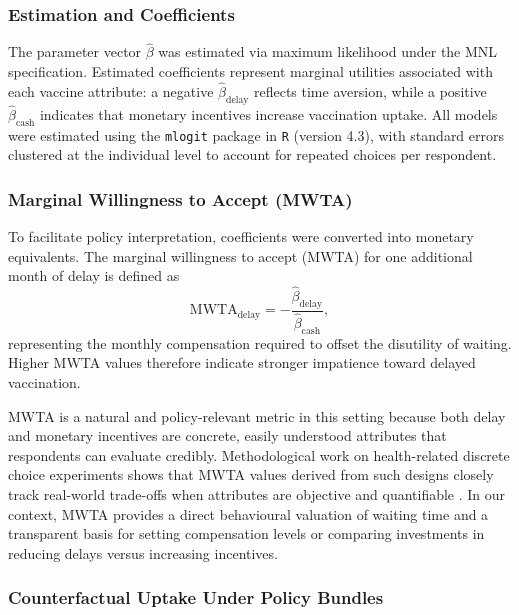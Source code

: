 \documentclass[12pt]{article}
\begin{document}
\subsubsection{Estimation and Coefficients}

The parameter vector $\hat{\beta}$ was estimated via maximum likelihood under the MNL
specification. Estimated coefficients represent marginal utilities associated with each
vaccine attribute: a negative $\hat{\beta}_{\text{delay}}$ reflects time aversion, while a
positive $\hat{\beta}_{\text{cash}}$ indicates that monetary incentives increase vaccination
uptake. All models were estimated using the \texttt{mlogit} package in \texttt{R} (version
4.3), with standard errors clustered at the individual level to account for repeated choices
per respondent.

\subsubsection{Marginal Willingness to Accept (MWTA)}

To facilitate policy interpretation, coefficients were converted into monetary equivalents.
The marginal willingness to accept (MWTA) for one additional month of delay is defined as
\[
\text{MWTA}_{\text{delay}} = -\frac{\hat{\beta}_{\text{delay}}}{\hat{\beta}_{\text{cash}}},
\]
representing the monthly compensation required to offset the disutility of waiting. Higher
MWTA values therefore indicate stronger impatience toward delayed vaccination.

MWTA is a natural and policy-relevant metric in this setting because both delay and monetary
incentives are concrete, easily understood attributes that respondents can evaluate
credibly. Methodological work on health-related discrete choice experiments shows that MWTA
values derived from such designs closely track real-world trade-offs when attributes are
objective and quantifiable \citep{Johnson2013,Veldwijk2019}. In our context, MWTA provides a
direct behavioural valuation of waiting time and a transparent basis for setting compensation
levels or comparing investments in reducing delays versus increasing incentives.

\subsubsection{Counterfactual Uptake Under Policy Bundles}
\end{document}
